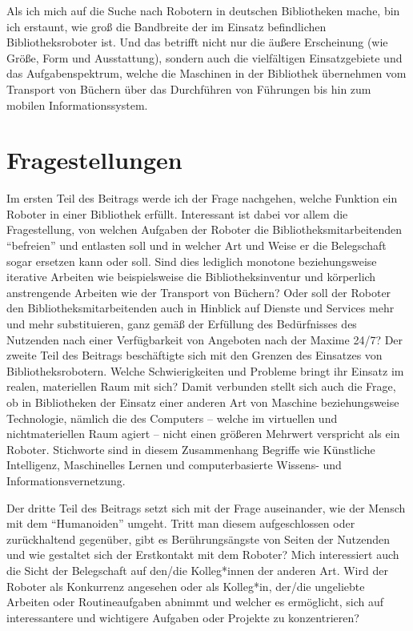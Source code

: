 \documentclass[a4paper,
fontsize=11pt,
oneside,
numbers=noperiodatend,
parskip=half-,
bibliography=totoc,
final
]{scrartcl}
\begin{document}
Als ich mich auf die Suche nach Robotern in deutschen Bibliotheken
mache, bin ich erstaunt, wie groß die Bandbreite der im Einsatz
befindlichen Bibliotheksroboter ist. Und das betrifft nicht nur die
äußere Erscheinung (wie Größe, Form und Ausstattung), sondern auch die
vielfältigen Einsatzgebiete und das Aufgabenspektrum, welche die
Maschinen in der Bibliothek übernehmen vom Transport von Büchern über
das Durchführen von Führungen bis hin zum mobilen Informationssystem.

\hypertarget{fragestellungen}{%
\section{Fragestellungen}\label{fragestellungen}}

Im ersten Teil des Beitrags werde ich der Frage nachgehen, welche
Funktion ein Roboter in einer Bibliothek erfüllt. Interessant ist dabei
vor allem die Fragestellung, von welchen Aufgaben der Roboter die
Bibliotheksmitarbeitenden \enquote{befreien} und entlasten soll und in
welcher Art und Weise er die Belegschaft sogar ersetzen kann oder soll.
Sind dies lediglich monotone beziehungsweise iterative Arbeiten wie
beispielsweise die Bibliotheksinventur und körperlich anstrengende
Arbeiten wie der Transport von Büchern? Oder soll der Roboter den
Bibliotheksmitarbeitenden auch in Hinblick auf Dienste und Services mehr
und mehr substituieren, ganz gemäß der Erfüllung des Bedürfnisses des
Nutzenden nach einer Verfügbarkeit von Angeboten nach der Maxime 24/7?
Der zweite Teil des Beitrags beschäftigte sich mit den Grenzen des
Einsatzes von Bibliotheksrobotern. Welche Schwierigkeiten und Probleme
bringt ihr Einsatz im realen, materiellen Raum mit sich? Damit verbunden
stellt sich auch die Frage, ob in Bibliotheken der Einsatz einer anderen
Art von Maschine beziehungsweise Technologie, nämlich die des Computers
-- welche im virtuellen und nichtmateriellen Raum agiert -- nicht einen
größeren Mehrwert verspricht als ein Roboter. Stichworte sind in diesem
Zusammenhang Begriffe wie Künstliche Intelligenz, Maschinelles Lernen
und computerbasierte Wissens- und Informationsvernetzung.

Der dritte Teil des Beitrags setzt sich mit der Frage auseinander, wie
der Mensch mit dem \enquote{Humanoiden} umgeht. Tritt man diesem
aufgeschlossen oder zurückhaltend gegenüber, gibt es Berührungsängste
von Seiten der Nutzenden und wie gestaltet sich der Erstkontakt mit dem
Roboter? Mich interessiert auch die Sicht der Belegschaft auf den/die
Kolleg*innen der anderen Art. Wird der Roboter als Konkurrenz angesehen
oder als Kolleg*in, der/die ungeliebte Arbeiten oder Routineaufgaben
abnimmt und welcher es ermöglicht, sich auf interessantere und
wichtigere Aufgaben oder Projekte zu konzentrieren?
\end{document}
